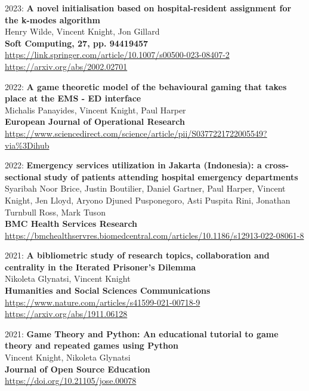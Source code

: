 \documentclass[10pt]{article}
\begin{document}
\begin{etaremune}
\item
  2023: \textbf{A novel initialisation based on hospital-resident assignment for the k-modes algorithm}\\
  Henry Wilde, Vincent Knight, Jon Gillard\\
  \textbf{Soft Computing, 27, pp. 94419457}\\
  \url{https://link.springer.com/article/10.1007/s00500-023-08407-2}\\
  \url{https://arxiv.org/abs/2002.02701}\\

\item
  2022: \textbf{A game theoretic model of the behavioural gaming that takes place at the EMS - ED interface}\\
  Michalis Panayides, Vincent Knight, Paul Harper\\
  \textbf{European Journal of Operational Research}\\
  \url{https://www.sciencedirect.com/science/article/pii/S0377221722005549?via%3Dihub}\\
  

\item
  2022: \textbf{Emergency services utilization in Jakarta (Indonesia): a cross-sectional study of patients attending hospital emergency departments}\\
  Syaribah Noor Brice, Justin Boutilier, Daniel Gartner, Paul Harper, Vincent Knight, Jen Lloyd, Aryono Djuned Pusponegoro, Asti Puspita Rini, Jonathan Turnbull Ross, Mark Tuson\\
  \textbf{BMC Health Services Research}\\
  \url{https://bmchealthservres.biomedcentral.com/articles/10.1186/s12913-022-08061-8}\\
  

\item
  2021: \textbf{A bibliometric study of research topics, collaboration and centrality in the Iterated Prisoner's Dilemma}\\
  Nikoleta Glynatsi, Vincent Knight\\
  \textbf{Humanities and Social Sciences Communications}\\
  \url{https://www.nature.com/articles/s41599-021-00718-9}\\
  \url{https://arxiv.org/abs/1911.06128}\\

\item
  2021: \textbf{Game Theory and Python: An educational tutorial to game theory and repeated games using Python}\\
  Vincent Knight, Nikoleta Glynatsi\\
  \textbf{Journal of Open Source Education}\\
  \url{https://doi.org/10.21105/jose.00078}\\
  


\end{etaremune}
\end{document}

